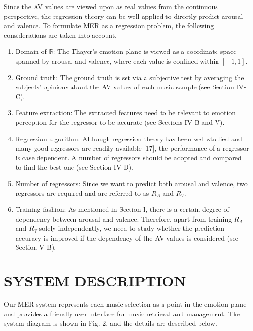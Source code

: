 \documentclass[journal, twoside]{IEEEtran}
\begin{document}
Since the AV values are viewed upon as real values from the
continuous perspective, the regression theory can be well applied to directly predict arousal and valence. To formulate MER as a regression problem, the following considerations are taken into account.
\begin{enumerate}
    \item Domain of \(\mathbb{R}\): The Thayer’s emotion plane is viewed as a coordinate space spanned by arousal and valence, where each value is confined within \([-1,1]\).
    
    \item Ground truth: The ground truth is set via a subjective test by averaging the subjects’ opinions about the AV values of each music sample (see Section IV-C).
    
    \item Feature extraction: The extracted features need to be relevant to emotion perception for the regressor to be accurate (see Sections IV-B and V).
    
    \item Regression algorithm: Although regression theory has been well studied and many good regressors are readily available [17], the performance of a regressor is case dependent. A number of regressors should be adopted and compared to find the best one (see Section IV-D).
    
    \item Number of regressors: Since we want to predict both arousal and valence, two regressors are required and are referred to as \(R_A\) and \(R_V\).
    
    \item Training fashion: As mentioned in Section I, there is a certain degree of dependency between arousal and valence. Therefore, apart from training \(R_A\) and \(R_V\) solely independently, we need to study whether the prediction accuracy is improved if the dependency of the AV values is considered (see Section V-B).
    
\end{enumerate}

\section{SYSTEM DESCRIPTION}
Our MER system represents each music selection as a point
in the emotion plane and provides a friendly user interface for music retrieval and management. The system diagram is shown in Fig. 2, and the details are described below.
\end{document}
